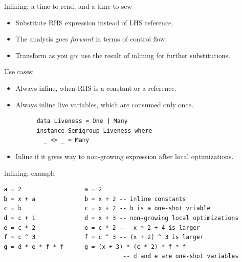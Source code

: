 \documentclass[handout]{beamer}
\begin{document}
\begin{frame}[fragile]{Inlining: a time to rend, and a time to sew}

\begin{itemize}
\item Substitute RHS expression instead of LHS reference.
\item The analysis goes {\em forward} in terms of control flow.
\item Transform as you go: use the result of inlining for further substitutions.
\end{itemize}

Use cases:

\begin{itemize}
\item Always inline, when RHS is a constant or a reference.
\item Always inline live variables, which are consumed only once.
      \begin{lstlisting}
      data Liveness = One | Many
      instance Semigroup Liveness where
        _ <> _ = Many
      \end{lstlisting}
\item Inline if it gives way to non-growing expression after local optimizations.
\end{itemize}

\end{frame}

\begin{frame}[fragile]{Inlining: example}

\begin{lstlisting}
a = 2                  a = 2
b = x + a              b = x + 2 -- inline constants
c = b                  c = x + 2 -- b is a one-shot vriable
d = c + 1              d = x + 3 -- non-growing local optimizations
e = c * 2              e = c * 2 --  x * 2 + 4 is larger
f = c ^ 3              f = c ^ 3 -- (x + 2) ^ 3 is larger
g = d * e * f * f      g = (x + 3) * (c * 2) * f * f
                                  -- d and e are one-shot variables
\end{lstlisting}

\end{frame}
\end{document}
